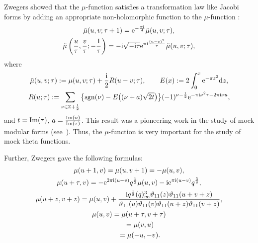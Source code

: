 \documentclass[pdftex]{sigma}
\numberwithin{equation}{section}
\theoremstyle{definition}
\newcommand{\Zz}{\mathbb{Z}}
\begin{document}
Zwegers showed that the $\mu$-function satisfies a transformation law like Jacobi forms by adding an appropriate non-holomorphic function to the $\mu$-function \cite{Zw1}:
\begin{gather*}
\tilde{\mu}(u,v;\tau+1)
 =
 {\rm e}^{-\frac{\pi{\rm i}}{4}}\tilde{\mu}(u,v;\tau), \\
\tilde{\mu}\left(\frac{u}{\tau},\frac{v}{\tau};-\frac{1}{\tau}\right)
 =
 -{\rm i}\sqrt{-{\rm i}\tau}{\rm e}^{\pi{\rm i}\frac{(u-v)^2}{\tau}}\tilde{\mu}(u,v;\tau),
\end{gather*}
where
\begin{gather*}
\tilde{\mu}(u,v;\tau)
 :=
 \mu(u,v;\tau)+\frac{{\rm i}}{2}R(u-v;\tau), \qquad
E(x)
 :=
 2\int_0^x {\rm e}^{-\pi z^2}{\rm d}z, \nonumber \\
R(u;\tau)
 :=
 \sum_{\nu\in\Zz+\frac{1}{2}}\big\{{\rm sgn}(\nu)-E\big((\nu+a)\sqrt{2t}\big)\big\}(-1)^{\nu-\frac{1}{2}}{\rm e}^{-\pi{\rm i}\nu^2\tau-2\pi{\rm i}\nu u}, \nonumber
\end{gather*}
and $t={\rm Im}(\tau)$, $a=\frac{{\rm Im}(u)}{{\rm Im}(\tau)}$.
This result was a pioneering work in the study of mock modular forms (see~\cite{BFOR}).
Thus, the $\mu$-function is very important for the study of mock theta functions.

Further, Zwegers gave the following formulas:
\begin{gather}
\label{eq:mu periodicity}
\mu(u+1,v)
 =
 \mu(u,v+1)=-\mu(u,v), \\
\label{eq:mu pseudo periodicity}
\mu(u+\tau,v)
 =
 -{\rm e}^{2\pi{\rm i}(u-v)}q^\frac{1}{2}\mu(u,v)-{\rm i}{\rm e}^{\pi{\rm i}(u-v)}q^\frac{3}{8}, \\
\label{eq:mu translation}
\mu(u+z,v+z)
 =
 \mu(u,v)+\frac{{\rm i}q^{\frac{1}{8}}(q)_{\infty }^{3}\vartheta_{11}(z)\vartheta_{11}(u+v+z)}{\vartheta_{11}(u)\vartheta_{11}(v)\vartheta_{11}(u+z)\vartheta_{11}(v+z)}, \\
\label{eq:mu symmetry}
\mu(u,v)
 =
 \mu(u+\tau,v+\tau) \\
\label{eq:mu symmetry2}
 \hphantom{\mu(u,v)}{} =
 \mu(v,u) \\
\label{eq:mu symmetry3}
 \hphantom{\mu(u,v)}{} =
 \mu(-u,-v).
\end{gather}
\end{document}
